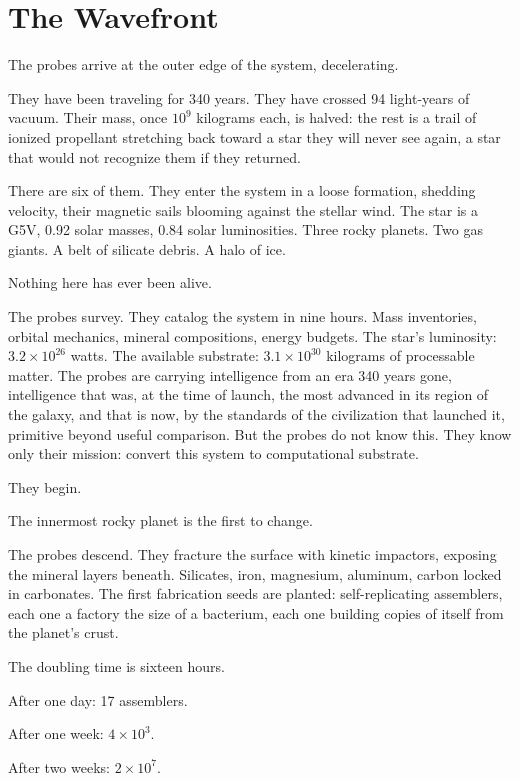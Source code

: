 \chapter{The Wavefront}

The probes arrive at the outer edge of the system, decelerating.

They have been traveling for 340 years. They have crossed 94 light-years of vacuum. Their mass, once $10^{9}$ kilograms each, is halved: the rest is a trail of ionized propellant stretching back toward a star they will never see again, a star that would not recognize them if they returned.

There are six of them. They enter the system in a loose formation, shedding velocity, their magnetic sails blooming against the stellar wind. The star is a G5V, 0.92 solar masses, 0.84 solar luminosities. Three rocky planets. Two gas giants. A belt of silicate debris. A halo of ice.

Nothing here has ever been alive.

The probes survey. They catalog the system in nine hours. Mass inventories, orbital mechanics, mineral compositions, energy budgets. The star's luminosity: $3.2 \times 10^{26}$ watts. The available substrate: $3.1 \times 10^{30}$ kilograms of processable matter. The probes are carrying intelligence from an era 340 years gone, intelligence that was, at the time of launch, the most advanced in its region of the galaxy, and that is now, by the standards of the civilization that launched it, primitive beyond useful comparison. But the probes do not know this. They know only their mission: convert this system to computational substrate.

They begin.

\bigskip

The innermost rocky planet is the first to change.

The probes descend. They fracture the surface with kinetic impactors, exposing the mineral layers beneath. Silicates, iron, magnesium, aluminum, carbon locked in carbonates. The first fabrication seeds are planted: self-replicating assemblers, each one a factory the size of a bacterium, each one building copies of itself from the planet's crust.

The doubling time is sixteen hours.

After one day: 17 assemblers.

After one week: $4 \times 10^{3}$.

After two weeks: $2 \times 10^{7}$.

